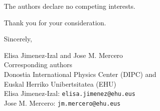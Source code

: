 \documentclass[11pt]{article}
\begin{document}
The authors declare no competing interests.

Thank you for your consideration.

Sincerely,

Elisa Jimenez-Izal and Jose M. Mercero\\
Corresponding authors\\
Donostia International Physics Center (DIPC) and\\
Euskal Herriko Unibertsitatea (EHU)\\
Elisa Jimenez-Izal: \texttt{elisa.jimenez@ehu.eus}\\
Jose M. Mercero: \texttt{jm.mercero@ehu.eus}
\end{document}
